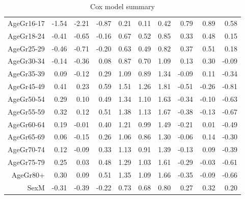 \begin{table}[ht]
\begin{tabular}{rrrrrrrrrr}
  AgeGr16-17 & -1.54 & -2.21 & -0.87 & 0.21 & 0.11 & 0.42 & 0.79 & 0.89 & 0.58 \\ 
  AgeGr18-24 & -0.41 & -0.65 & -0.16 & 0.67 & 0.52 & 0.85 & 0.33 & 0.48 & 0.15 \\ 
  AgeGr25-29 & -0.46 & -0.71 & -0.20 & 0.63 & 0.49 & 0.82 & 0.37 & 0.51 & 0.18 \\ 
  AgeGr30-34 & -0.14 & -0.36 & 0.08 & 0.87 & 0.70 & 1.09 & 0.13 & 0.30 & -0.09 \\ 
  AgeGr35-39 & 0.09 & -0.12 & 0.29 & 1.09 & 0.89 & 1.34 & -0.09 & 0.11 & -0.34 \\ 
  AgeGr45-49 & 0.41 & 0.23 & 0.59 & 1.51 & 1.26 & 1.81 & -0.51 & -0.26 & -0.81 \\ 
  AgeGr50-54 & 0.29 & 0.10 & 0.49 & 1.34 & 1.10 & 1.63 & -0.34 & -0.10 & -0.63 \\ 
  AgeGr55-59 & 0.32 & 0.12 & 0.51 & 1.38 & 1.13 & 1.67 & -0.38 & -0.13 & -0.67 \\ 
  AgeGr60-64 & 0.19 & -0.01 & 0.40 & 1.21 & 0.99 & 1.49 & -0.21 & 0.01 & -0.49 \\ 
  AgeGr65-69 & 0.06 & -0.15 & 0.26 & 1.06 & 0.86 & 1.30 & -0.06 & 0.14 & -0.30 \\ 
  AgeGr70-74 & 0.12 & -0.09 & 0.33 & 1.13 & 0.91 & 1.39 & -0.13 & 0.09 & -0.39 \\ 
  AgeGr75-79 & 0.25 & 0.03 & 0.48 & 1.29 & 1.03 & 1.61 & -0.29 & -0.03 & -0.61 \\ 
  AgeGr80+ & 0.30 & 0.09 & 0.51 & 1.35 & 1.09 & 1.66 & -0.35 & -0.09 & -0.66 \\ 
  SexM & -0.31 & -0.39 & -0.22 & 0.73 & 0.68 & 0.80 & 0.27 & 0.32 & 0.20 \\ 
   \hline
\end{tabular}
\caption{Cox model summary} 
\end{table}
